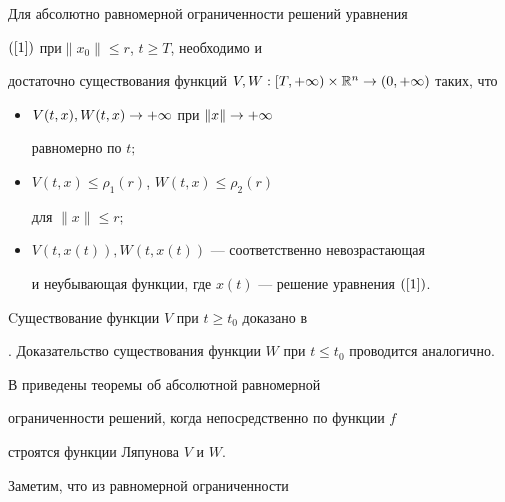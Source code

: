 \begin{thm}\label{T_1}


Для абсолютно равномерной ограниченности решений уравнения


$(\ref{1})$ при\linebreak $\|x_{0}\|\leq r$, $t \geq T$, необходимо и


достаточно существования функций $V,W:[T,+\infty)


\times \R^{n}\rar (0,+\infty) $ таких, что


\begin{itemize}


\item[a)] $V(t,x),W(t,x) \rightarrow +\infty $ при $\|x\| \rightarrow +\infty$


равномерно по $t;$


\item[b)] $V(t,x) \leq \rho_{1}(r)$, $W(t,x) \leq \rho_{2}(r)$


для $\|x\|\leq r;$


\item[c)] $V(t,x(t)),W(t,x(t))$ --- соответственно невозрастающая


и неубывающая функции, где $x(t)$ --- решение уравнения $(\ref{1})$.


\end{itemize}


\end{thm}





\begin{pf}


Cуществование функции $V$ при $t \geq


t_{0}$ доказано в


\cite{9}. Доказательство существования функции $W$ при $t \leq


t_{0}$ проводится аналогично.


\end{pf}





В \cite{10} приведены теоремы об абсолютной равномерной


ограниченности решений, когда непосредственно по функции $f$


строятся функции Ляпунова $V$ и $W$.





Заметим, что из равномерной ограниченности


